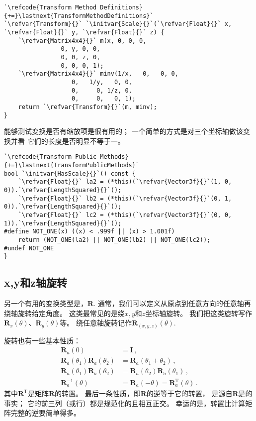 \begin{lstlisting}
`\refcode{Transform Method Definitions}{+=}\lastnext{TransformMethodDefinitions}`
`\refvar{Transform}{}` `\initvar{Scale}{}`(`\refvar{Float}{}` x, `\refvar{Float}{}` y, `\refvar{Float}{}` z) {
    `\refvar{Matrix4x4}{}` m(x, 0, 0, 0,
                0, y, 0, 0,
                0, 0, z, 0,
                0, 0, 0, 1);
    `\refvar{Matrix4x4}{}` minv(1/x,   0,   0, 0,
                   0,   1/y,   0, 0,
                   0,     0, 1/z, 0,
                   0,     0,   0, 1);
    return `\refvar{Transform}{}`(m, minv);
}
\end{lstlisting}

能够测试变换是否有缩放项是很有用的；
一个简单的方式是对三个坐标轴做该变换并看
它们的长度是否明显不等于一。
\begin{lstlisting}
`\refcode{Transform Public Methods}{+=}\lastnext{TransformPublicMethods}`
bool `\initvar{HasScale}{}`() const {
    `\refvar{Float}{}` la2 = (*this)(`\refvar{Vector3f}{}`(1, 0, 0)).`\refvar{LengthSquared}{}`();
    `\refvar{Float}{}` lb2 = (*this)(`\refvar{Vector3f}{}`(0, 1, 0)).`\refvar{LengthSquared}{}`();
    `\refvar{Float}{}` lc2 = (*this)(`\refvar{Vector3f}{}`(0, 0, 1)).`\refvar{LengthSquared}{}`();
#define NOT_ONE(x) ((x) < .999f || (x) > 1.001f)
    return (NOT_ONE(la2) || NOT_ONE(lb2) || NOT_ONE(lc2));
#undef NOT_ONE
}
\end{lstlisting}

\subsection{x,y和z轴旋转}\label{sub:x,y和z轴旋转}
另一个有用的变换类型是，$\bm R$.
通常，我们可以定义从原点到任意方向的任意轴再绕轴旋转给定角度。
这类最常见的是绕$x,y$和$z$坐标轴旋转。
我们把这类旋转写作$\bm R_x(\theta)$、$\bm R_y(\theta)$等。
绕任意轴旋转记作$\bm R_{(x,y,z)}(\theta)$.

旋转也有一些基本性质：
\begin{align*}
    \bm R_a(0)                         & =\bm I\, ,                                       \\
    \bm R_a(\theta_1)\bm R_a(\theta_2) & =\bm R_a(\theta_1+\theta_2)\, ,                  \\
    \bm R_a(\theta_1)\bm R_a(\theta_2) & =\bm R_a(\theta_2)\bm R_a(\theta_1)\, ,          \\
    \bm R_a^{-1}(\theta)               & =\bm R_a(-\theta)=\bm R_a^\mathrm{T}(\theta)\, .
\end{align*}
其中$\bm R^\mathrm{T}$是矩阵$\bm R$的转置。
最后一条性质，即$\bm R$的逆等于它的转置，
是源自$\bm R$是的事实；
它的前三列（或行）都是规范化的且相互正交。
幸运的是，转置比计算矩阵完整的逆要简单得多。

